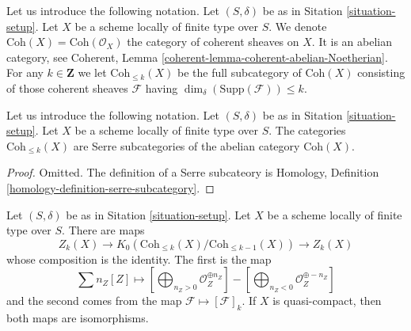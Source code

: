 \medskip\noindent
Let us introduce the following notation.
Let $(S, \delta)$ be as in Sitation \ref{situation-setup}.
Let $X$ be a scheme locally of finite type over $S$.
We denote $\text{Coh}(X) = \text{Coh}(\mathcal{O}_X)$
the category of coherent sheaves on $X$.
It is an abelian category, see
Coherent, Lemma \ref{coherent-lemma-coherent-abelian-Noetherian}.
For any $k \in \mathbf{Z}$ we let $\text{Coh}_{\leq k}(X)$
be the full subcategory of $\text{Coh}(X)$
consisting of those coherent sheaves $\mathcal{F}$
having $\dim_\delta(\text{Supp}(\mathcal{F})) \leq k$.

\begin{lemma}
\label{lemma-Serre-subcategories}
Let us introduce the following notation.
Let $(S, \delta)$ be as in Sitation \ref{situation-setup}.
Let $X$ be a scheme locally of finite type over $S$.
The categories $\text{Coh}_{\leq k}(X)$ are Serre subcategories
of the abelian category $\text{Coh}(X)$.
\end{lemma}

\begin{proof}
Omitted. The definition of a Serre subcateory is
Homology, Definition \ref{homology-definition-serre-subcategory}.
\end{proof}

\begin{lemma}
\label{lemma-cycles-k-group}
Let $(S, \delta)$ be as in Sitation \ref{situation-setup}.
Let $X$ be a scheme locally of finite type over $S$.
There are maps
$$
Z_k(X)
\longrightarrow
K_0(\text{Coh}_{\leq k}(X)/\text{Coh}_{\leq k - 1}(X))
\longrightarrow
Z_k(X)
$$
whose composition is the identity. The first is the map
$$
\sum n_Z[Z] \mapsto
\left[\bigoplus\nolimits_{n_Z > 0} \mathcal{O}_Z^{\oplus n_Z}\right]
-
\left[\bigoplus\nolimits_{n_Z < 0} \mathcal{O}_Z^{\oplus -n_Z}\right]
$$
and the second comes from the map $\mathcal{F} \mapsto [\mathcal{F}]_k$.
If $X$ is quasi-compact, then both maps are isomorphisms.
\end{lemma}

